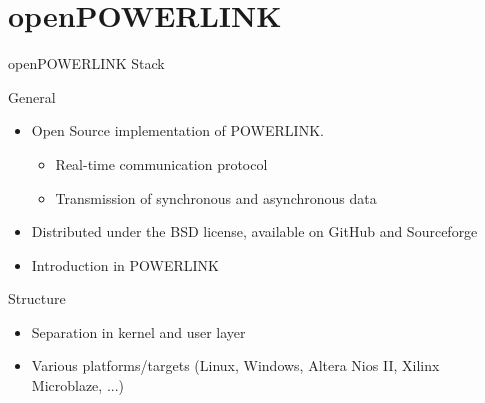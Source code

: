 \section{openPOWERLINK}
\begin{frame}{openPOWERLINK Stack}
    \begin{block}{General}
        \begin{itemize}
            \item Open Source implementation of POWERLINK.
            \begin{itemize}
                \item Real-time communication protocol
                \item Transmission of synchronous and asynchronous data
            \end{itemize}
            \item Distributed under the BSD license, available on GitHub and Sourceforge
            \item Introduction in POWERLINK
        \end{itemize}
    \end{block}
    \begin{block}{Structure}
        \begin{itemize}
            \item Separation in kernel and user layer
            \item Various platforms/targets (Linux, Windows, Altera Nios II, Xilinx Microblaze, ...)
            
        \end{itemize}
    \end{block}
\end{frame}

